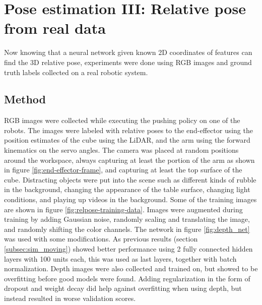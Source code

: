 \chapter{Pose estimation III: Relative pose from real data}

Now knowing that a neural network given known 2D coordinates of features can
find the 3D relative pose, experiments were done using RGB images and ground
truth labels collected on a real robotic system.

\section{Method}

RGB images were collected while executing the pushing policy on one of the
robots. The images were labeled with relative poses to the end-effector using
the position estimates of the cube using the LiDAR, and the arm using the
forward kinematics on the servo angles. The camera was placed at random
positions around the workspace, always capturing at least the portion of the
arm as shown in figure \ref{fig:end-effector-frame}, and capturing at least the
top surface of the cube. Distracting objects were put into the scene such as
different kinds of rubble in the background, changing the appearance of the
table surface, changing light conditions, and playing up videos in the
background. Some of the training images are shown in figure
\ref{fig:relpose-training-data}. Images were augmented during training by
adding Gaussian noise, randomly scaling and translating the image, and randomly
shifting the color channels. The network in figure \ref{fig:depth_net} was used
with some modifications. As previous results (section \ref{subsec:sim_moving})
showed better performance using 2 fully connected hidden layers with 100 units
each, this was used as last layers, together with batch normalization. Depth
images were also collected and trained on, but showed to be overfitting before
good models were found. Adding regularization in the form of dropout and weight
decay did help against overfitting when using depth, but instead resulted in
worse validation scores.

